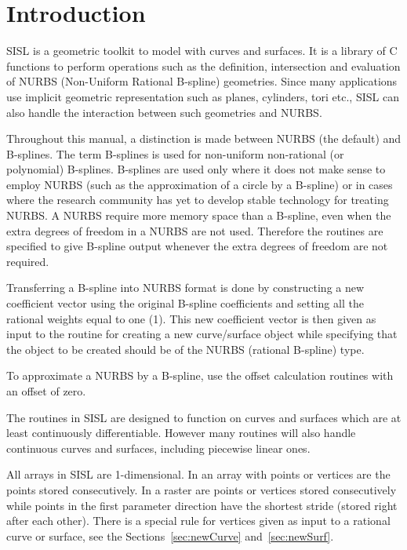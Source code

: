 \chapter{Introduction}
\label{introduction}
SISL is a geometric toolkit to model with curves and surfaces. It is a
library of C functions to perform operations such as the definition,
intersection and evaluation of NURBS (Non-Uniform Rational B-spline)
geometries. Since many applications use implicit geometric
representation such as planes, cylinders, tori etc., SISL can also
handle the interaction between such geometries and NURBS.

\medskip
Throughout this manual, a distinction is made between NURBS (the
default) and B-splines. The term B-splines is used for non-uniform
non-rational (or polynomial) B-splines. B-splines are used only where it
does not make sense to employ NURBS (such as the approximation of a
circle by a B-spline) or in cases where the research
community has yet to develop stable technology for treating NURBS.
A NURBS require more memory space than a B-spline, even when the
extra degrees of freedom in a NURBS are not used. Therefore the routines
are specified to give B-spline output whenever the extra degrees of
freedom are not required.

Transferring a B-spline into NURBS format is done by constructing a new
coefficient vector using the original B-spline coefficients and setting
all the rational weights equal to one (1).
This new coefficient vector is then given as input to the routine for
creating a new curve/surface object while specifying that the object to
be created should be of the NURBS (rational B-spline) type.

To approximate a NURBS by a B-spline, use the offset calculation
routines with an offset of zero.

The routines in SISL are designed to function on curves and surfaces
which are at least continuously differentiable. However many routines
will also handle continuous curves and surfaces, including piecewise
linear ones.

\medskip
All arrays in SISL are 1-dimensional. In an array with points or vertices
are the points stored consecutively. In a raster are points or vertices
stored consecutively while points in the first parameter direction have
the shortest stride (stored right after each other). There is a special
rule for vertices given as input to a rational curve or surface, see the
Sections~\ref{sec:newCurve} and~\ref{sec:newSurf}.

